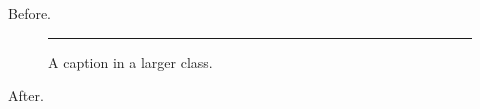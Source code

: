 \documentclass[14pt]{beamer}
\begin{document}
\begin{frame}[plain,t]
Before.\begin{figure}\rule{40pt}{12pt}\caption*{A caption in a larger class.}\end{figure}After.
\end{frame}
\end{document}
